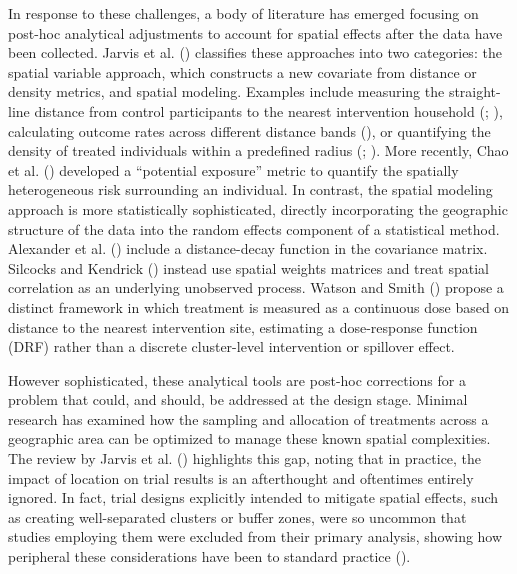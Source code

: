 \documentclass[
  12pt,
  prelim]{bios-prelim}
\begin{document}
In response to these challenges, a body of literature has emerged
focusing on post-hoc analytical adjustments to account for spatial
effects after the data have been collected. Jarvis et al.
() classifies these approaches
into two categories: the spatial variable approach, which constructs a
new covariate from distance or density metrics, and spatial modeling.
Examples include measuring the straight-line distance from control
participants to the nearest intervention household
(;
),
calculating outcome rates across different distance bands
(), or quantifying
the density of treated individuals within a predefined radius
(;
). More
recently, Chao et al. ()
developed a ``potential exposure'' metric to quantify the spatially
heterogeneous risk surrounding an individual. In contrast, the spatial
modeling approach is more statistically sophisticated, directly
incorporating the geographic structure of the data into the random
effects component of a statistical method. Alexander et al.
() include a distance-decay
function in the covariance matrix. Silcocks and Kendrick
() instead use spatial weights
matrices and treat spatial correlation as an underlying unobserved
process. Watson and Smith ()
propose a distinct framework in which treatment is measured as a
continuous dose based on distance to the nearest intervention site,
estimating a dose-response function (DRF) rather than a discrete
cluster-level intervention or spillover effect.

However sophisticated, these analytical tools are post-hoc corrections
for a problem that could, and should, be addressed at the design stage.
Minimal research has examined how the sampling and allocation of
treatments across a geographic area can be optimized to manage these
known spatial complexities. The review by Jarvis et al.
() highlights this gap, noting
that in practice, the impact of location on trial results is an
afterthought and oftentimes entirely ignored. In fact, trial designs
explicitly intended to mitigate spatial effects, such as creating
well-separated clusters or buffer zones, were so uncommon that studies
employing them were excluded from their primary analysis, showing how
peripheral these considerations have been to standard practice
().
\end{document}
